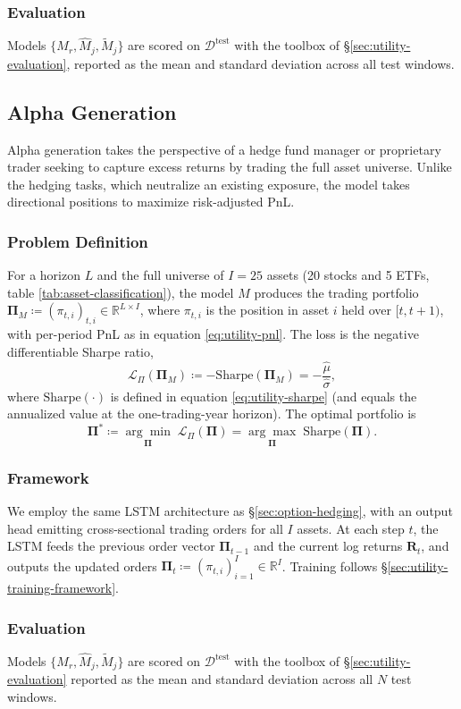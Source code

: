     \subsubsection{Evaluation}
    Models \(\{M_r, \hat{M}_j, \tilde{M}_j\}\) are scored on
    \(\mathcal{D}^{\mathrm{test}}\) with the toolbox of
    §\ref{sec:utility-evaluation}, reported as the mean and standard
    deviation across all test windows.

\subsection{Alpha Generation}\label{sec:alpha-generation}
    Alpha generation takes the perspective of a hedge fund manager or
    proprietary trader seeking to capture excess returns by trading the
    full asset universe. Unlike the hedging tasks, which neutralize an
    existing exposure, the model takes directional positions to maximize
    risk-adjusted PnL.

    \subsubsection{Problem Definition}
    For a horizon \(L\) and the full universe of \(I = 25\) assets (20
    stocks and 5 ETFs, table \ref{tab:asset-classification}), the model
    \(M\) produces the trading portfolio \(\mathbf{\Pi}_M \coloneq
    (\pi_{t,i})_{t,i} \in \mathbb{R}^{L \times I}\), where \(\pi_{t,i}\) is
    the position in asset \(i\) held over \([t, t+1)\), with per-period PnL
    as in equation \ref{eq:utility-pnl}. The loss is the negative
    differentiable Sharpe ratio,
    \begin{equation}
      \mathcal{L}_{\Pi}(\mathbf{\Pi}_M) \coloneq -
      \mathrm{Sharpe}(\mathbf{\Pi}_M) = -\frac{\hat{\mu}}{\hat{\sigma}},
      \label{eq:alpha-sharpe-loss}
    \end{equation}
    where \(\mathrm{Sharpe}(\cdot)\) is defined in equation
    \ref{eq:utility-sharpe} (and equals the annualized value at the
    one-trading-year horizon). The optimal portfolio is
    \begin{equation}
        \mathbf{\Pi}^{*} \coloneq
        \underset{\mathbf{\Pi}}{\arg\min}\;
        \mathcal{L}_{\Pi}(\mathbf{\Pi}) 
        = \underset{\mathbf{\Pi}}{\arg\max}\;
        \mathrm{Sharpe}(\mathbf{\Pi}).
      \label{eq:alpha-objective}
    \end{equation}

    \subsubsection{Framework}
    We employ the same LSTM architecture as §\ref{sec:option-hedging}, with
    an output head emitting cross-sectional trading orders for all \(I\)
    assets. At each step \(t\), the LSTM feeds the previous order vector
    \(\mathbf{\Pi}_{t-1}\) and the current log returns \(\mathbf{R}_t\), and
    outputs the updated orders \(\mathbf{\Pi}_t \coloneq
    (\pi_{t,i})_{i=1}^{I} \in \mathbb{R}^{I}\). Training follows
    §\ref{sec:utility-training-framework}.

    \subsubsection{Evaluation}
    Models \(\{M_r, \hat{M}_j, \tilde{M}_j\}\) are scored on
    \(\mathcal{D}^{\mathrm{test}}\) with the toolbox of
    §\ref{sec:utility-evaluation}  reported as the mean and standard deviation across all
    \(N\) test windows.
